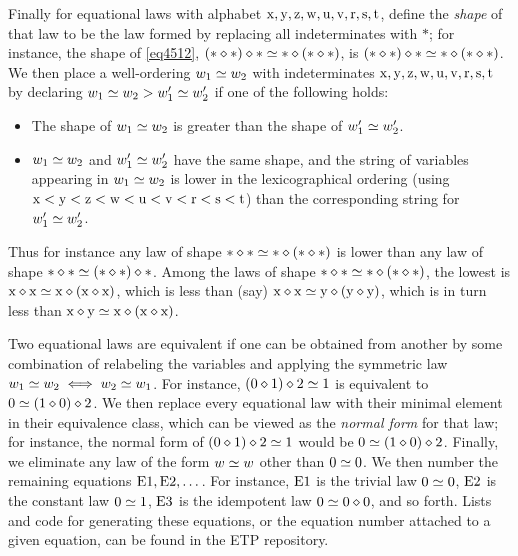 Finally for equational laws with alphabet $\mathrm{x},\mathrm{y},\mathrm{z},\mathrm{w},\mathrm{u},\mathrm{v},\mathrm{r},\mathrm{s},\mathrm{t}$, define the \emph{shape} of that law to be the law formed by replacing all indeterminates with $\ast$; for instance, the shape of \eqref{eq4512}, $(\ast \diamond \ast) \diamond \ast \simeq \ast \diamond (\ast \diamond \ast)$, is $(\ast \diamond \ast) \diamond \ast \simeq \ast \diamond (\ast \diamond \ast)$.  We then place a well-ordering $w_1 \simeq w_2$ with indeterminates $\mathrm{x},\mathrm{y},\mathrm{z},\mathrm{w},\mathrm{u},\mathrm{v},\mathrm{r},\mathrm{s},\mathrm{t}$ by declaring $w_1 \simeq w_2 > w'_1 \simeq w'_2$ if one of the following holds:
\begin{itemize}
\item The shape of $w_1 \simeq w_2$ is greater than the shape of $w'_1 \simeq w'_2$.
\item $w_1 \simeq w_2$ and $w'_1 \simeq w'_2$ have the same shape, and the string of variables appearing in $w_1 \simeq w_2$ is lower in the lexicographical ordering (using $\mathrm{x} < \mathrm{y} < \mathrm{z} < \mathrm{w} < \mathrm{u} < \mathrm{v} < \mathrm{r} < \mathrm{s} < \mathrm{t}$) than the corresponding string for $w'_1 \simeq w'_2$.
\end{itemize}
Thus for instance any law of shape $\ast \diamond \ast \simeq \ast \diamond (\ast \diamond \ast)$ is lower than any law of shape
$\ast \diamond \ast \simeq (\ast \diamond \ast) \diamond \ast$.  Among the laws of shape $\ast \diamond \ast \simeq \ast \diamond (\ast \diamond \ast)$, the lowest is $\mathrm{x} \diamond \mathrm{x} \simeq \mathrm{x} \diamond (\mathrm{x} \diamond \mathrm{x})$, which is less than (say) $\mathrm{x} \diamond \mathrm{x} \simeq \mathrm{y} \diamond (\mathrm{y} \diamond \mathrm{y})$, which is in turn less than $\mathrm{x} \diamond \mathrm{y} \simeq \mathrm{x} \diamond (\mathrm{x} \diamond \mathrm{x})$.

Two equational laws are equivalent if one can be obtained from another by some combination of relabeling the variables and applying the symmetric law $w_1 \simeq w_2 \iff w_2 \simeq w_1$.  For instance, $(0 \diamond 1) \diamond 2 \simeq 1$ is equivalent to $0 \simeq (1 \diamond 0) \diamond 2$.  We then replace every equational law with their minimal element in their equivalence class, which can be viewed as the \emph{normal form} for that law; for instance, the normal form of $(0 \diamond 1) \diamond 2 \simeq 1$ would be $0 \simeq (1 \diamond 0) \diamond 2$.  Finally, we eliminate any law of the form $w \simeq w$ other than $0 \simeq 0$.  We then number the remaining equations $\mathrm{E}1, \mathrm{E}2, \dots$.  For instance, $\mathrm{E}1$ is the trivial law $0 \simeq 0$, $\mathrm{E}2$ is the constant law $0 \simeq 1$, $\mathrm{E}3$ is the idempotent law $0 \simeq 0 \diamond 0$, and so forth.  Lists and code for generating these equations, or the equation number attached to a given equation, can be found in the ETP repository.

